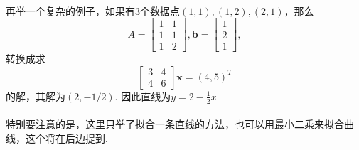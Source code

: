 \paragraph{}
再举一个复杂的例子，如果有3个数据点$(1, 1), (1, 2), (2, 1)$，那么
$$
A = \begin{bmatrix}
1 & 1 \\
1 & 1 \\
1 & 2 
\end{bmatrix}, \textbf{b} =  \begin{bmatrix}
1 \\
2 \\
1 
\end{bmatrix},
$$
转换成求
$$
 \begin{bmatrix}
3& 4 \\
4 & 6
\end{bmatrix} \textbf{x} = (4, 5)^T
$$
的解，其解为$(2, -1/2)$. 因此直线为$y = 2 - \frac{1}{2} x$

\paragraph{}
特别要注意的是，这里只举了拟合一条直线的方法，也可以用最小二乘来拟合曲线，这个将在后边提到. 









